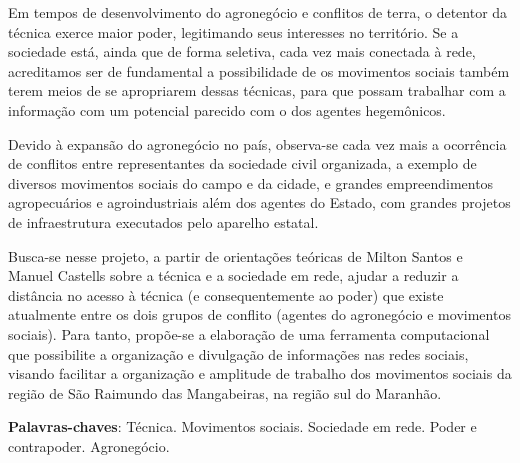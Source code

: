 \begin{resumoumacoluna}
Em tempos de desenvolvimento do agronegócio e conflitos de terra, o detentor da técnica exerce maior poder, legitimando seus interesses no território. Se a sociedade está, ainda que de forma seletiva, cada vez mais conectada à rede, acreditamos ser de fundamental a possibilidade de os movimentos sociais também terem meios de se apropriarem dessas técnicas, para que possam trabalhar com a informação com um potencial parecido com o dos agentes hegemônicos.

Devido à expansão do agronegócio no país, observa-se cada vez mais a ocorrência de  conflitos entre representantes da sociedade civil organizada, a exemplo de diversos movimentos sociais do campo e da cidade, e grandes empreendimentos agropecuários e agroindustriais além dos agentes do Estado, com  grandes projetos de infraestrutura executados pelo aparelho estatal.


Busca-se nesse projeto, a partir de orientações teóricas de Milton Santos e Manuel Castells sobre a técnica e a sociedade em rede, ajudar a reduzir a distância no acesso à técnica (e consequentemente ao poder) que existe atualmente entre os dois grupos de conflito (agentes do agronegócio e movimentos sociais). Para tanto, propõe-se a elaboração de uma ferramenta computacional que possibilite a organização e divulgação de informações nas redes sociais, visando facilitar a organização e amplitude de trabalho dos movimentos sociais da região de São Raimundo das Mangabeiras, na região sul do Maranhão.

 \vspace{\onelineskip}
 \noindent
 \textbf{Palavras-chaves}: Técnica. Movimentos sociais. Sociedade em rede. Poder e contrapoder. Agronegócio.
\end{resumoumacoluna}

